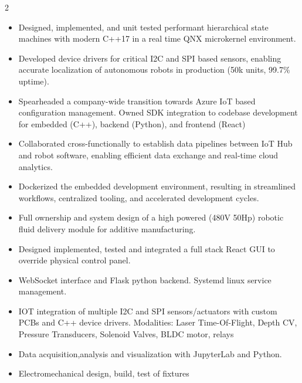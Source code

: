\documentclass[10pt,a4paper,ragged2e,withhyper]{altacv}
\begin{document}
\begin{paracol}{2}



\begin{itemize}

\item Designed, implemented, and unit tested performant hierarchical state machines with modern C++17 in a real time QNX microkernel environment. 
\item Developed device drivers for critical I2C and SPI based sensors, enabling accurate localization of autonomous robots in production (50k units, 99.7\% uptime).                                                        
\item Spearheaded a company-wide transition towards Azure IoT based configuration management. Owned SDK integration to codebase development for embedded (C++), backend (Python), and frontend (React)                                              
\item Collaborated cross-functionally to establish data pipelines between IoT Hub and robot software, enabling efficient data exchange and real-time cloud analytics.                       
\item Dockerized the embedded development environment, resulting in streamlined workflows, centralized tooling, and accelerated development cycles.
\end{itemize}
\divider
{}
\begin{itemize}
\item Full ownership and system design of a high powered (480V 50Hp) robotic fluid delivery module for additive manufacturing.
\item Designed implemented, tested and integrated a full stack React GUI to override physical control panel.
\item WebSocket interface and Flask python backend.  
Systemd linux service management.
\item IOT integration  of multiple I2C and SPI sensors/actuators with custom PCBs and C++ device drivers. Modalities: Laser Time-Of-Flight, Depth CV, Pressure Transducers, Solenoid Valves,  BLDC motor, relays 
\item Data acquisition,analysis and visualization with JupyterLab and Python.
\item Electromechanical design, build, test of fixtures
\end{itemize}
\divider


\end{paracol}
\end{document}
